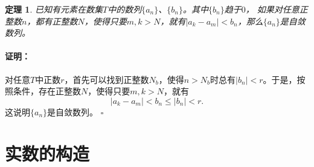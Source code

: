\documentclass[12pt,UTF8]{ctexbook}
\newtheorem{tm}{定理}[section]
\newenvironment{proof2}{\paragraph{\textbf{证明：}}}{\hfill$\square$}
\begin{document}
\begin{appendix}
\begin{tm}\label{tm:a-0-80}
    已知有元素在数集$T$中的数列$\{a_n\}$、$\{b_n\}$。其中$\{b_n\}$趋于$0$，
    如果对任意正整数$n$，都有正整数$N$，使得只要$m,k>N$，就有$|a_k - a_m| < b_n$，那么$\{a_n\}$是自敛数列。
\end{tm}
\begin{proof2}
    对任意$T$中正数$r$，首先可以找到正整数$N_b$，使得$n>N_b$时总有$|b_n| < r$。于是，按照条件，存在正整数$N$，使得只要$m,k>N$，就有
    $$|a_k - a_m| < b_n \leqslant |b_n| < r.$$
    这说明$\{a_n\}$是自敛数列。
\end{proof2}

\section{实数的构造}



\end{appendix}
\end{document}
